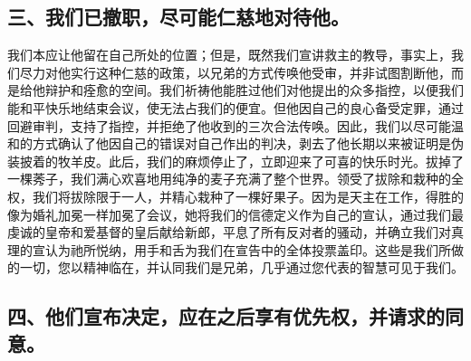 
\subsection{三、我们已撤职，尽可能仁慈地对待他。}

我们本应让他留在自己所处的位置；但是，既然我们宣讲救主的教导，事实上，我们尽力对他实行这种仁慈的政策，以兄弟的方式传唤他受审，并非试图割断他，而是给他辩护和痊愈的空间。我们祈祷他能胜过他们对他提出的众多指控，以便我们能和平快乐地结束会议，使无法占我们的便宜。但他因自己的良心备受定罪，通过回避审判，支持了指控，并拒绝了他收到的三次合法传唤。因此，我们以尽可能温和的方式确认了他因自己的错误对自己作出的判决，剥去了他长期以来被证明是伪装披着的牧羊皮。此后，我们的麻烦停止了，立即迎来了可喜的快乐时光。拔掉了一棵莠子，我们满心欢喜地用纯净的麦子充满了整个世界。领受了拔除和栽种的全权，我们将拔除限于一人，并精心栽种了一棵好果子。因为是天主在工作，得胜的像为婚礼加冕一样加冕了会议，她将我们的信德定义作为自己的宣认，通过我们最虔诚的皇帝和爱基督的皇后献给新郎，平息了所有反对者的骚动，并确立我们对真理的宣认为祂所悦纳，用手和舌为我们在宣告中的全体投票盖印。这些是我们所做的一切，您以精神临在，并认同我们是兄弟，几乎通过您代表的智慧可见于我们。\par


\subsection{四、他们宣布决定，应在之后享有优先权，并请求的同意。}

